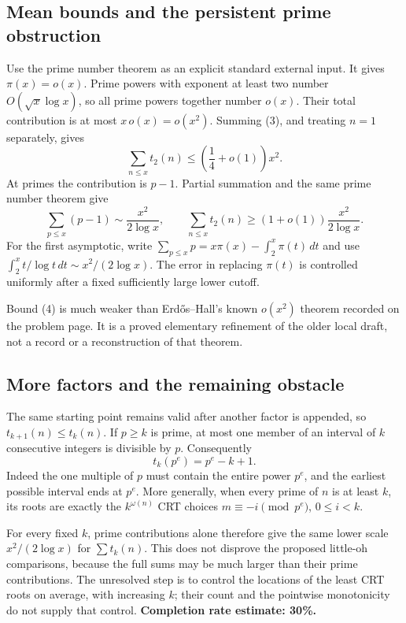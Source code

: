 \subsection*{Mean bounds and the persistent prime obstruction}
Use the prime number theorem as an explicit standard external input. It gives $\pi(x)=o(x)$. Prime powers with exponent at least two number $O(\sqrt x\log x)$, so all prime powers together number $o(x)$. Their total contribution is at most $x\,o(x)=o(x^2)$. Summing (3), and treating $n=1$ separately, gives
\[
 \sum_{n\le x}t_2(n)\le\left(\frac14+o(1)\right)x^2. \tag{4}
\]
At primes the contribution is $p-1$. Partial summation and the same prime number theorem give
\[
 \sum_{p\le x}(p-1)\sim\frac{x^2}{2\log x},
 \qquad
 \sum_{n\le x}t_2(n)\ge(1+o(1))\frac{x^2}{2\log x}. \tag{5}
\]
For the first asymptotic, write $\sum_{p\le x}p=x\pi(x)-\int_2^x\pi(t)\,dt$ and use $\int_2^x t/\log t\,dt\sim x^2/(2\log x)$. The error in replacing $\pi(t)$ is controlled uniformly after a fixed sufficiently large lower cutoff.

Bound (4) is much weaker than Erd\H{o}s--Hall's known $o(x^2)$ theorem recorded on the problem page. It is a proved elementary refinement of the older local draft, not a record or a reconstruction of that theorem.

\subsection*{More factors and the remaining obstacle}
The same starting point remains valid after another factor is appended, so $t_{k+1}(n)\le t_k(n)$. If $p\ge k$ is prime, at most one member of an interval of $k$ consecutive integers is divisible by $p$. Consequently
\[
 t_k(p^e)=p^e-k+1. \tag{6}
\]
Indeed the one multiple of $p$ must contain the entire power $p^e$, and the earliest possible interval ends at $p^e$. More generally, when every prime of $n$ is at least $k$, its roots are exactly the $k^{\omega(n)}$ CRT choices $m\equiv-i\pmod{p^e}$, $0\le i<k$.

For every fixed $k$, prime contributions alone therefore give the same lower scale $x^2/(2\log x)$ for $\sum t_k(n)$. This does not disprove the proposed little-oh comparisons, because the full sums may be much larger than their prime contributions. The unresolved step is to control the locations of the least CRT roots on average, with increasing $k$; their count and the pointwise monotonicity do not supply that control.
\textbf{Completion rate estimate: 30\%.}
